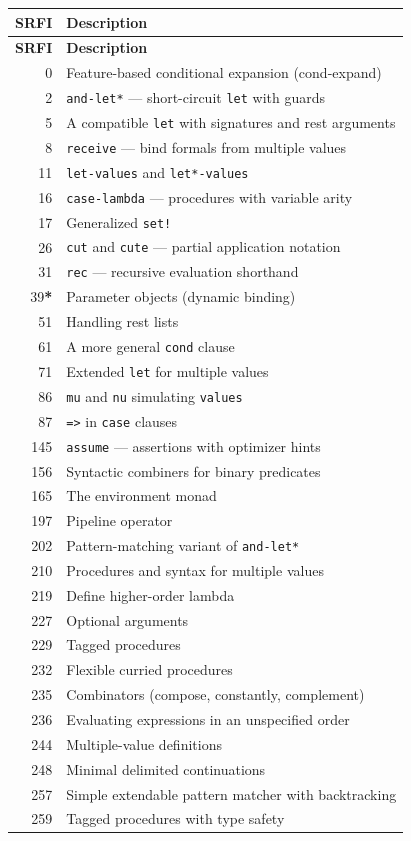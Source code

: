 \begin{longtable}{rp{9cm}}
\textbf{SRFI} & \textbf{Description} \\
\hline
\endfirsthead
\textbf{SRFI} & \textbf{Description} \\
\hline
\endhead
0 & Feature-based conditional expansion (cond-expand) \\
2 & \texttt{and-let*} --- short-circuit \texttt{let} with guards \\
5 & A compatible \texttt{let} with signatures and rest arguments \\
8 & \texttt{receive} --- bind formals from multiple values \\
11 & \texttt{let-values} and \texttt{let*-values} \\
16 & \texttt{case-lambda} --- procedures with variable arity \\
17 & Generalized \texttt{set!} \\
26 & \texttt{cut} and \texttt{cute} --- partial application notation \\
31 & \texttt{rec} --- recursive evaluation shorthand \\
39\textbf{*} & Parameter objects (dynamic binding) \\
51 & Handling rest lists \\
61 & A more general \texttt{cond} clause \\
71 & Extended \texttt{let} for multiple values \\
86 & \texttt{mu} and \texttt{nu} simulating \texttt{values} \\
87 & \texttt{=>} in \texttt{case} clauses \\
145 & \texttt{assume} --- assertions with optimizer hints \\
156 & Syntactic combiners for binary predicates \\
165 & The environment monad \\
197 & Pipeline operator \\
202 & Pattern-matching variant of \texttt{and-let*} \\
210 & Procedures and syntax for multiple values \\
219 & Define higher-order lambda \\
227 & Optional arguments \\
229 & Tagged procedures \\
232 & Flexible curried procedures \\
235 & Combinators (compose, constantly, complement) \\
236 & Evaluating expressions in an unspecified order \\
244 & Multiple-value definitions \\
248 & Minimal delimited continuations \\
257 & Simple extendable pattern matcher with backtracking \\
259 & Tagged procedures with type safety \\
\end{longtable}

